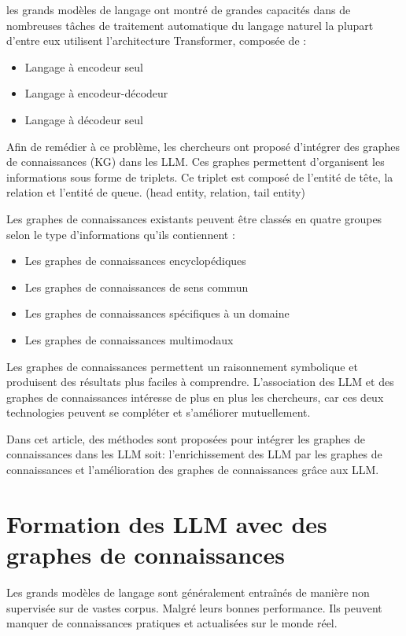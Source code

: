\documentclass[12pt,a4paper]{report}
\begin{document}
les grands modèles de langage ont montré de grandes capacités dans de nombreuses 
tâches de traitement automatique du langage naturel la plupart d'entre eux utilisent 
l'architecture Transformer, composée de :
\begin{itemize}
    \item Langage à encodeur seul
    \item Langage à encodeur-décodeur
    \item Langage à décodeur seul
\end{itemize}

Afin de remédier à ce problème, les chercheurs ont proposé d'intégrer des graphes de 
connaissances (KG) dans les LLM. Ces graphes permettent d'organisent les informations sous forme de triplets.
Ce triplet est composé de l'entité de tête, la relation et l'entité de queue.
(head entity, relation, tail entity)

Les graphes de connaissances existants peuvent être classés en quatre groupes selon le type d'informations 
qu'ils contiennent :
\begin{itemize}
    \item Les graphes de connaissances encyclopédiques
    \item Les graphes de connaissances de sens commun
    \item Les graphes de connaissances spécifiques à un domaine
    \item Les graphes de connaissances multimodaux
\end{itemize}

Les graphes de connaissances permettent un raisonnement symbolique et produisent des résultats 
plus faciles à comprendre. L'association des LLM et des graphes de connaissances intéresse de 
plus en plus les chercheurs, car ces deux technologies peuvent se compléter et s'améliorer 
mutuellement.

Dans cet article, des méthodes sont proposées pour intégrer les graphes de connaissances 
dans les LLM soit: l'enrichissement des LLM par les graphes de connaissances et l'amélioration des 
graphes de connaissances grâce aux LLM.

\section{Formation des LLM avec des graphes de connaissances}
Les grands modèles de langage sont généralement entraînés de manière non supervisée sur 
de vastes corpus. Malgré leurs bonnes performance. Ils peuvent manquer de connaissances 
pratiques et actualisées sur le monde réel.
\end{document}
